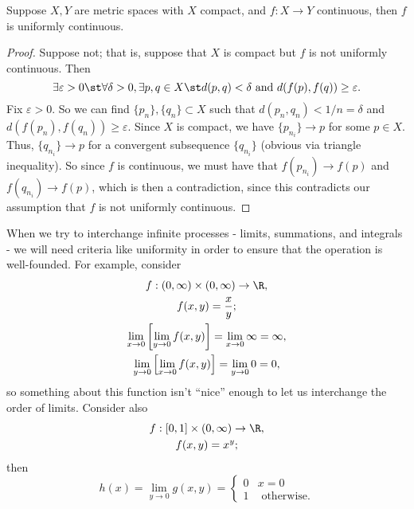 \documentclass{notes}
\begin{document}
\begin{theorem}
  Suppose $X,Y$ are metric spaces with $X$ compact, and $f: X\to Y$ continuous, then $f$ is
  uniformly continuous.
\end{theorem}
\begin{proof} %
 Suppose not; that is, suppose that $X$ is compact but $f$ is not uniformly continuous. Then
 $$\exists \varepsilon > 0 \st \forall \delta > 0, \exists p,q\in X \st d(p,q) < \delta \text{ and }
 d(f(p), f(q)) \geq \varepsilon.$$ Fix $\varepsilon > 0$. So we can find $\{p_n\}, \{q_n\} \subset
 X$ such that $d(p_n, q_n) < 1/n = \delta$ and $d(f(p_n), f(q_n)) \geq \varepsilon$. Since $X$ is
 compact, we have $\{p_{n_i}\} \to p$ for some $p\in X$. Thus, $\{q_{n_i}\} \to p$ for a convergent
 subsequence $\{q_{n_i}\}$ (obvious via triangle inequality). So since $f$ is continuous, we must
 have that $f(p_{n_i}) \to f(p)$ and $f(q_{n_i}) \to f(p)$, which is then a contradiction, since
 this contradicts our assumption that $f$ is not uniformly continuous.
\end{proof}

When we try to interchange infinite processes - limits, summations, and integrals - we will need
criteria like uniformity in order to ensure that the operation is well-founded. For example,
consider 
\begin{gather*}
  f: (0, \infty) \times (0, \infty) \to \R, \\
  f(x,y) = \frac{x}{y}; \\
  \lim_{x\to 0} \left[ \lim_{y\to 0} f(x,y) \right] = \lim_{x\to 0} \infty = \infty, \\
  \lim_{y\to 0} \left[ \lim_{x\to 0} f(x,y) \right] = \lim_{y\to 0} 0 = 0, 
\end{gather*}
so something about this function isn't ``nice'' enough to let us interchange the order of limits.
Consider also
\begin{gather*}
  f: [0,1] \times (0, \infty) \to \R, \\
  f(x,y) = x^y;
\end{gather*}
then $$h(x) = \lim_{y\to 0} g(x,y) = \begin{cases} 0 &x = 0 \\ 1 &\text{ otherwise.} \end{cases}$$
\end{document}

